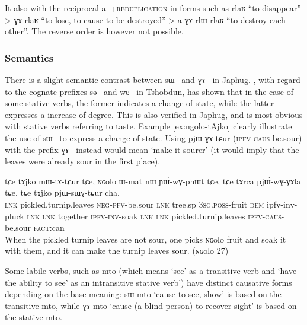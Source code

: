 \documentclass[oldfontcommands,oneside,a4paper,11pt]{article}
\newcommand{\ipa}[1]{{\phon \mbox{#1}}} %
\begin{document}
It also with the reciprocal \ipa{a}--+\textsc{reduplication} in forms such as \ipa{rlaʁ}    ``to disappear'' > \ipa{ɣɤ-rlaʁ} ``to lose, to cause to be destroyed'' > \ipa{a-ɣɤ-rlɯ-rlaʁ} ``to destroy each other''. The reverse order is however not possible.
 

\subsubsection{Semantics} \label{subsub:caus-g:semantics}
There is a slight semantic contrast between \ipa{sɯ--} and \ipa{ɣɤ--} in Japhug. \citet{jackson06paisheng, jackson13morpho}, with regard to   the cognate prefixes \ipa{sə}-- and \ipa{wɐ}--  in Tshobdun, has shown that in the case of some stative verbs, the former indicates a change of state, while the latter expresses a increase of degree. This is also verified in Japhug, and is most obvious with stative verbs referring to taste. Example \ref{ex:ngolo-tAjko} clearly illustrate the use of \ipa{sɯ--} to express a change of state. Using \ipa{pjɯ-ɣɤ-tɕur} (\textsc{ipfv-caus}-be.sour) with the prefix \ipa{ɣɤ--} instead would mean `make it sourer' (it would imply that the leaves were already sour in the first place).

 \begin{exe}
\ex \label{ex:ngolo-tAjko}
\gll
\ipa{tɕe} 	\ipa{tɤjko} 	\ipa{mɯ-tɤ-tɕur} 	\ipa{tɕe,} 	\ipa{ɴɢolo} 	\ipa{ɯ-mat} 	\ipa{nɯ} 	\ipa{ɲɯ́-wɣ-phɯt} 	\ipa{tɕe,} 	\ipa{tɕe} 	\ipa{tɤrca} 	\ipa{pjɯ́-wɣ-ɣɤla} 	\ipa{tɕe,} 	\ipa{tɕe} 	\ipa{tɤjko} 	\ipa{pjɯ-sɯɣ-tɕur} 	\ipa{cha.} \\ 
\textsc{lnk} pickled.turnip.leaves \textsc{neg-pfv}-be.sour \textsc{lnk} tree.sp \textsc{3sg.poss}-fruit \textsc{dem} ipfv-inv-pluck \textsc{lnk} \textsc{lnk} together \textsc{ipfv-inv}-soak \textsc{lnk} \textsc{lnk}  pickled.turnip.leaves \textsc{ipfv-caus}-be.sour \textsc{fact}:can \\
 \glt When the pickled turnip leaves are not sour, one picks \ipa{ɴɢolo} fruit and soak it with them, and it can make the turnip leaves sour.   (\ipa{ɴɢolo} 27)
   \end{exe}

Some labile verbs, such as \ipa{mto} (which means `see' as a transitive verb and `have the ability to see' as an intransitive stative verb') have distinct causative forms depending on the base meaning: \ipa{sɯ-mto} `cause to see, show' is based on the transitive \ipa{mto}, while \ipa{ɣɤ-mto} `cause (a blind person) to recover sight' is based on the stative \ipa{mto}.
\end{document}
